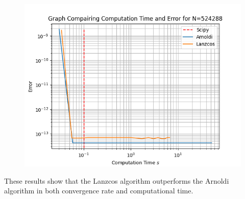 \documentclass{article}
\begin{document}
\begin{figure}[H]
\begin{minipage}{0.5\textwidth}
	  \label{fig:MEe6}
       \centering
	  \includegraphics[width=\linewidth]{Plots/Comp time v E Results for N=524288.png}
	  \label{fig:MEe6}
    \end{minipage}
\end{figure}
These results show that the Lanzcos algorithm outperforms the Arnoldi algorithm in both convergence rate and computational time.
\end{document}
